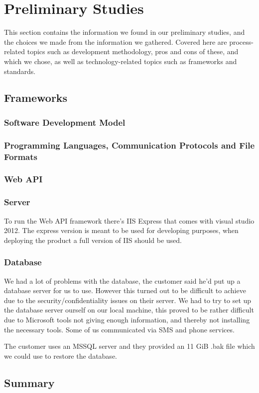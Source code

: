 \section{Preliminary Studies}
This section contains the information we found in our preliminary studies, and the choices we made from the information we gathered. Covered here are process-related topics such as development methodology, pros and cons of these, and which we chose, as well as technology-related topics such as frameworks and standards.


\newpage

\subsection{Frameworks}
\subsubsection{Software Development Model}
\subsubsection{Programming Languages, Communication Protocols and File Formats}
\subsubsection{Web API}
\subsubsection{Server}
To run the Web API framework there's IIS Express that comes with visual studio 2012. The express version is meant to be used for developing purposes, when deploying the product a full version of IIS should be used.
\subsubsection{Database}
We had a lot of problems with the database, the customer said he'd put up a database server for us to use. However this turned out to be difficult to achieve due to the security/confidentiality issues on their server. We had to try to set up the database server ourself on our local machine, this proved to be rather difficult due to Microsoft tools not giving enough information, and thereby not installing the necessary tools. Some of us communicated via SMS and phone services.

The customer uses an MSSQL server and they provided an 11 GiB .bak file which we could use to restore the database.


\subsection{Summary}